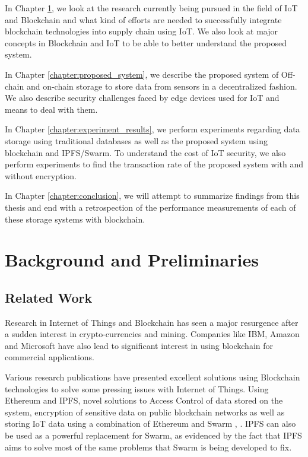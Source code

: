 \documentclass[11pt,openright]{report}
\begin{document}
\noindent In Chapter \ref{chapter:background}, we look at the research currently being pursued in the field of IoT and Blockchain and what kind of efforts are needed to successfully integrate blockchain technologies into supply chain using IoT. We also look at major concepts in Blockchain and IoT to be able to better understand the proposed system.\newline

\noindent In Chapter \ref{chapter:proposed_system}, we describe the proposed system of Off-chain and on-chain storage to store data from sensors in a decentralized fashion. We also describe security challenges faced by edge devices used for IoT and means to deal with them.\newline

\noindent In Chapter \ref{chapter:experiment_results}, we perform experiments regarding data storage using traditional databases as well as the proposed system using blockchain and IPFS/Swarm. To understand the cost of IoT security, we also perform experiments to find the transaction rate of the proposed system with and without encryption.\newline

\noindent In Chapter \ref{chapter:conclusion}, we will attempt to summarize findings from this thesis and end with a retrospection of the performance measurements of each of these storage systems with blockchain.\newline 



\chapter{Background and Preliminaries} \label{chapter:background}
\section{Related Work}\label{section:relatedwork}
Research in Internet of Things and Blockchain has seen a major resurgence after a sudden interest in crypto-currencies and mining. Companies like IBM, Amazon and Microsoft have also lead to significant interest in using blockchain for commercial applications. 

Various research publications have presented excellent solutions using Blockchain technologies to solve some pressing issues with Internet of Things. Using Ethereum and IPFS, novel solutions to  Access Control of data \cite{8400511} stored on the system, encryption of sensitive data on public blockchain networks \cite{8400511} as well as storing IoT data using a combination of Ethereum and Swarm \cite{8525388}, \cite{8634961}. IPFS can also be used as a powerful replacement for Swarm, as evidenced by the fact that IPFS aims to solve most of the same problems that Swarm is being developed to fix.
\end{document}
